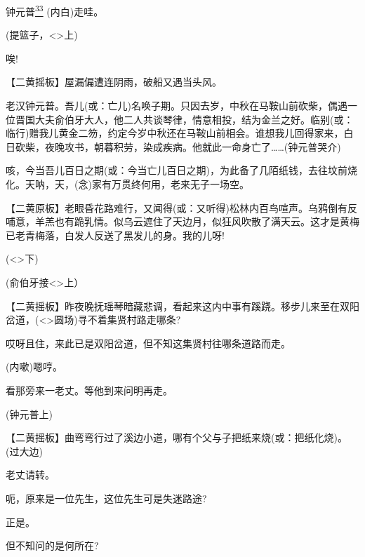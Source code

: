 {\vspace{5pt}

钟元普\protect\hyperlink{fn33}{\textsuperscript{33}} (内白)走哇。

(提篮子，\textless{}\!\textgreater{}上)

 唉!

 【二黄摇板】屋漏偏遭连阴雨，破船又遇当头风。

 老汉钟元普。吾儿(或：亡儿)名唤子期。只因去岁，中秋在马鞍山前砍柴，偶遇一位晋国大夫俞伯牙大人，他二人共谈琴律，情意相投，结为金兰之好。临别(或：临行)赠我儿黄金二笏，约定今岁中秋还在马鞍山前相会。谁想我儿回得家来，白日砍柴，夜晚攻书，朝暮积劳，染成疾病。他就此一命身亡了\ldots{}\ldots{}(钟元普哭介)

 咳，今当吾儿百日之期(或：今当亡儿百日之期)，为此备了几陌纸钱，去往坟前烧化。天呐，天，({\akai 念})家有万贯终何用，老来无子一场空。

 【二黄原板】老眼昏花路难行，又闻得(或：又听得)松林内百鸟喧声。乌鸦倒有反哺意，羊羔也有跪乳情。似乌云遮住了天边月，似狂风吹散了满天云。这才是黄梅已老青梅落，白发人反送了黑发儿的身。我的儿呀!

(\textless{}\!\textgreater{}下)

(俞伯牙接\textless{}\!\textgreater{}上）

 【二黄摇板】昨夜晚抚瑶琴暗藏悲调，看起来这内中事有蹊跷。移步儿来至在双阳岔道，(\textless{}\!\textgreater{}圆场)寻不着集贤村路走哪条?

 哎呀且住，来此已是双阳岔道，但不知这集贤村往哪条道路而走。

 (内嗽)嗯哼。

 看那旁来一老丈。等他到来问明再走。

(钟元普上)

 【二黄摇板】曲弯弯行过了溪边小道，哪有个父与子把纸来烧(或：把纸化烧)。(过大边)

 老丈请转。

 呃，原来是一位先生，这位先生可是失迷路途?

 正是。

 但不知问的是何所在?

}
